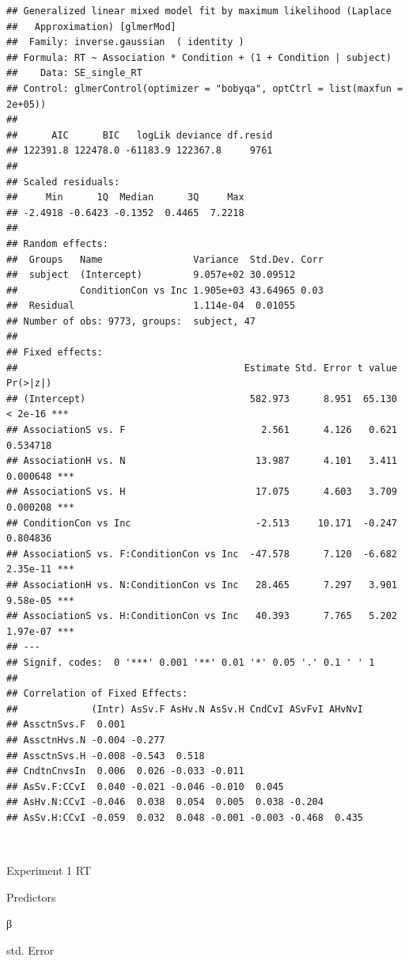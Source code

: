 \documentclass[
  man]{apa6}
\begin{document}
\begin{verbatim}
## Generalized linear mixed model fit by maximum likelihood (Laplace
##   Approximation) [glmerMod]
##  Family: inverse.gaussian  ( identity )
## Formula: RT ~ Association * Condition + (1 + Condition | subject)
##    Data: SE_single_RT
## Control: glmerControl(optimizer = "bobyqa", optCtrl = list(maxfun = 2e+05))
## 
##      AIC      BIC   logLik deviance df.resid 
## 122391.8 122478.0 -61183.9 122367.8     9761 
## 
## Scaled residuals: 
##     Min      1Q  Median      3Q     Max 
## -2.4918 -0.6423 -0.1352  0.4465  7.2218 
## 
## Random effects:
##  Groups   Name                Variance  Std.Dev. Corr
##  subject  (Intercept)         9.057e+02 30.09512     
##           ConditionCon vs Inc 1.905e+03 43.64965 0.03
##  Residual                     1.114e-04  0.01055     
## Number of obs: 9773, groups:  subject, 47
## 
## Fixed effects:
##                                        Estimate Std. Error t value Pr(>|z|)    
## (Intercept)                             582.973      8.951  65.130  < 2e-16 ***
## AssociationS vs. F                        2.561      4.126   0.621 0.534718    
## AssociationH vs. N                       13.987      4.101   3.411 0.000648 ***
## AssociationS vs. H                       17.075      4.603   3.709 0.000208 ***
## ConditionCon vs Inc                      -2.513     10.171  -0.247 0.804836    
## AssociationS vs. F:ConditionCon vs Inc  -47.578      7.120  -6.682 2.35e-11 ***
## AssociationH vs. N:ConditionCon vs Inc   28.465      7.297   3.901 9.58e-05 ***
## AssociationS vs. H:ConditionCon vs Inc   40.393      7.765   5.202 1.97e-07 ***
## ---
## Signif. codes:  0 '***' 0.001 '**' 0.01 '*' 0.05 '.' 0.1 ' ' 1
## 
## Correlation of Fixed Effects:
##             (Intr) AsSv.F AsHv.N AsSv.H CndCvI ASvFvI AHvNvI
## AssctnSvs.F  0.001                                          
## AssctnHvs.N -0.004 -0.277                                   
## AssctnSvs.H -0.008 -0.543  0.518                            
## CndtnCnvsIn  0.006  0.026 -0.033 -0.011                     
## AsSv.F:CCvI  0.040 -0.021 -0.046 -0.010  0.045              
## AsHv.N:CCvI -0.046  0.038  0.054  0.005  0.038 -0.204       
## AsSv.H:CCvI -0.059  0.032  0.048 -0.001 -0.003 -0.468  0.435
\end{verbatim}

~

Experiment 1 RT

Predictors

β

std. Error
\end{document}
